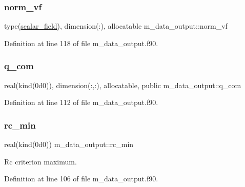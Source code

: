 \subsubsection{\texorpdfstring{norm\+\_\+vf}{norm\_vf}}
{\footnotesize\ttfamily type(\hyperlink{structm__derived__types_1_1scalar__field}{scalar\+\_\+field}), dimension(\+:), allocatable m\+\_\+data\+\_\+output\+::norm\+\_\+vf}



Definition at line 118 of file m\+\_\+data\+\_\+output.\+f90.

\mbox{\label{namespacem__data__output_ac5b476661d64159fdcd7364715495f30}} 
\subsubsection{\texorpdfstring{q\+\_\+com}{q\_com}}
{\footnotesize\ttfamily real(kind(0d0)), dimension(\+:,\+:), allocatable, public m\+\_\+data\+\_\+output\+::q\+\_\+com}



Definition at line 112 of file m\+\_\+data\+\_\+output.\+f90.

\mbox{\label{namespacem__data__output_adb7a215382fddf4e405b97cd2f1ddf0d}} 
\subsubsection{\texorpdfstring{rc\+\_\+min}{rc\_min}}
{\footnotesize\ttfamily real(kind(0d0)) m\+\_\+data\+\_\+output\+::rc\+\_\+min}



Rc criterion maximum. 



Definition at line 106 of file m\+\_\+data\+\_\+output.\+f90.

\mbox{\label{namespacem__data__output_a700c4b4763b7c2c1479fc05a658fa28d}} 
